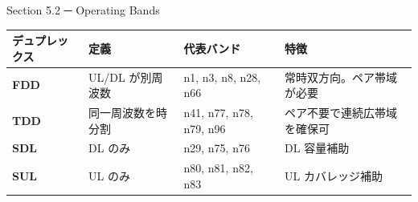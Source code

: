 \begin{frame}{Section 5.2 ─ Operating Bands}
\centering
\begin{tabular}{llll}
\toprule
デュプレックス & 定義 & 代表バンド & 特徴 \\
\midrule
\textbf{FDD} & UL/DL が別周波数 & n1, n3, n8, n28, n66 & 常時双方向。ペア帯域が必要 \\
\textbf{TDD} & 同一周波数を時分割 & n41, n77, n78, n79, n96 & ペア不要で連続広帯域を確保可 \\
\textbf{SDL} & DL のみ & n29, n75, n76 & DL 容量補助 \\
\textbf{SUL} & UL のみ & n80, n81, n82, n83 & UL カバレッジ補助 \\
\bottomrule
\end{tabular}
\end{frame}
